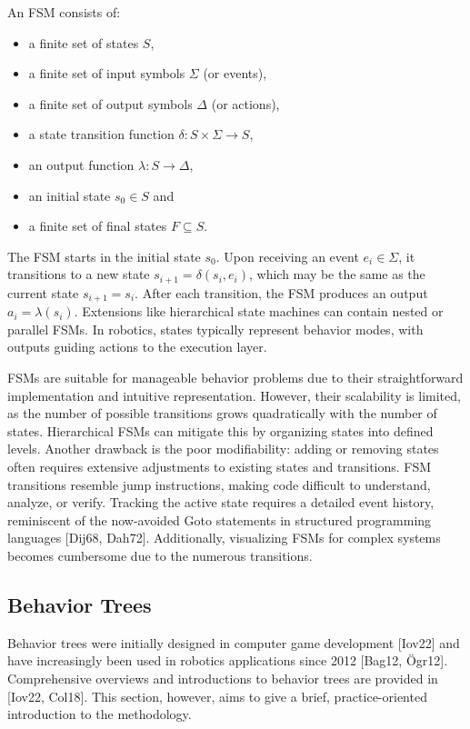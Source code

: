 An FSM consists of:

\begin{itemize}
  \item a finite set of states $S$,
  \item a finite set of input symbols $\Sigma$ (or events),
  \item a finite set of output symbols $\Delta$ (or actions),
  \item a state transition function $\delta: S \times \Sigma \rightarrow S$,
  \item an output function $\lambda: S \rightarrow \Delta$,
  \item an initial state $s_0 \in S$ and
  \item a finite set of final states $F \subseteq S$.
\end{itemize}

The FSM starts in the initial state $s_0$.
Upon receiving an event $e_i \in \Sigma$, it transitions to a new state $s_{i+1} = \delta(s_i, e_i)$, which may be the same as the current state $s_{i+1} = s_i$.
After each transition, the FSM produces an output $a_i = \lambda(s_i)$.
Extensions like hierarchical state machines can contain nested or parallel FSMs.
In robotics, states typically represent behavior modes, with outputs guiding actions to the execution layer.

FSMs are suitable for manageable behavior problems due to their straightforward implementation and intuitive representation.
However, their scalability is limited, as the number of possible transitions grows quadratically with the number of states.
Hierarchical FSMs can mitigate this by organizing states into defined levels.
Another drawback is the poor modifiability: adding or removing states often requires extensive adjustments to existing states and transitions.
FSM transitions resemble jump instructions, making code difficult to understand, analyze, or verify.
Tracking the active state requires a detailed event history, reminiscent of the now-avoided Goto statements in structured programming languages [Dij68, Dah72].
Additionally, visualizing FSMs for complex systems becomes cumbersome due to the numerous transitions.

\subsection{Behavior Trees}

Behavior trees were initially designed in computer game development [Iov22] and have increasingly been used in robotics applications since 2012 [Bag12, Ögr12].
Comprehensive overviews and introductions to behavior trees are provided in [Iov22, Col18].
This section, however, aims to give a brief, practice-oriented introduction to the methodology.

